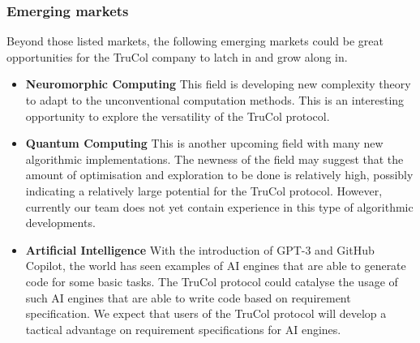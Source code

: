 \subsubsection{Emerging markets}\label{subsubsec:emerging_markets}
Beyond those listed markets, the following emerging markets could be great opportunities for the TruCol company to latch in and grow along in.
\begin{itemize}
	\item \textbf{Neuromorphic Computing} This field is developing new complexity theory to adapt to the unconventional computation methods. This is an interesting opportunity to explore the versatility of the TruCol protocol.
	\item \textbf{Quantum Computing} This is another upcoming field with many new algorithmic implementations. The newness of the field may suggest that the amount of optimisation and exploration to be done is relatively high, possibly indicating a relatively large potential for the TruCol protocol. However, currently our team does not yet contain experience in this type of algorithmic developments.
	\item \textbf{Artificial Intelligence} With the introduction of GPT-3 and GitHub Copilot, the world has seen examples of AI engines that are able to generate code for some basic tasks. The TruCol protocol could catalyse the usage of such AI engines that are able to write code based on requirement specification. We expect that users of the TruCol protocol will develop a tactical advantage on requirement specifications for AI engines.
\end{itemize}


